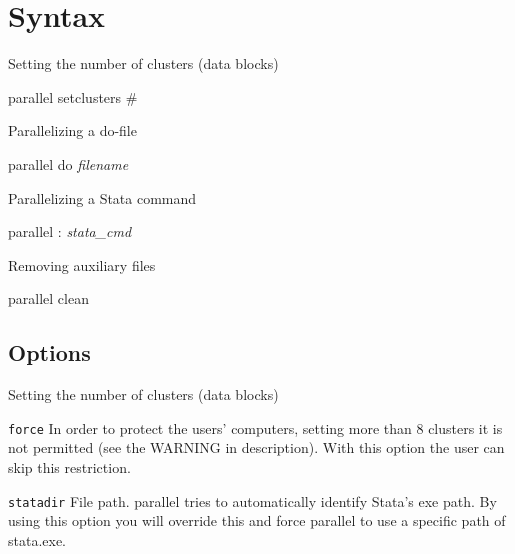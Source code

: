 \documentclass[bib]{statapress}
\begin{document}
\section{Syntax}

\noindent Setting the number of clusters (data blocks)

\begin{stsyntax}
parallel setclusters \#
\end{stsyntax}

\noindent Parallelizing a do-file

\begin{stsyntax}
parallel do {\it filename}
\end{stsyntax}

\noindent Parallelizing a Stata command

\begin{stsyntax}
parallel
	: {\it stata\_cmd}
\end{stsyntax}

\noindent Removing auxiliary files

\begin{stsyntax}
parallel clean 
\end{stsyntax}

\subsection{Options}

\noindent Setting the number of clusters (data blocks)

\hangpara
{\tt force} In order to protect the users' computers, setting more than 8 clusters it is not permitted (see the WARNING in description). With this option the user can skip this restriction.

\hangpara
{\tt statadir} File path. parallel tries to automatically identify Stata's exe path. By using this option you will override this and force parallel to use a specific path of stata.exe.
\end{document}
